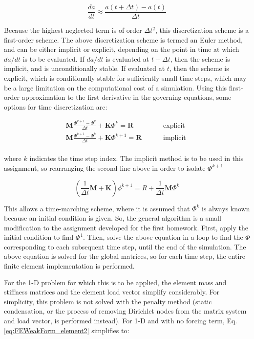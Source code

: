 \documentclass[10pt]{article}
\begin{document}
\begin{equation}
\frac{da}{dt}\approx\frac{a(t+\Delta t)-a(t)}{\Delta t}
\end{equation}

Because the highest neglected term is of order \(\Delta t^2\), this discretization scheme is a first-order scheme. The above discretization scheme is termed an Euler method, and can be either implicit or explicit, depending on the point in time at which \(da/dt\) is to be evaluated. If \(da/dt\) is evaluated at \(t+\Delta t\), then the scheme is implicit, and is unconditionally stable. If evaluated at \(t\), then the scheme is explicit, which is conditionally stable for sufficiently small time steps, which may be a large limitation on the computational cost of a simulation. Using this first-order approximation to the first derivative in the governing equations, some options for time discretization are:

\begin{equation}
\begin{aligned}
\textbf{M}\frac{\Phi^{k+1}-\Phi^k}{\Delta t}+\textbf{K}\Phi^{k}=\textbf{R} & \quad\quad\text{ explicit }\\
\textbf{M}\frac{\Phi^{k+1}-\Phi^k}{\Delta t}+\textbf{K}\Phi^{k+1}=\textbf{R} & \quad\quad\text{ implicit }\\
\end{aligned}
\end{equation}

where \(k\) indicates the time step index. The implicit method is to be used in this assignment, so rearranging the second line above in order to isolate \(\Phi^{k+1}\)

\begin{equation}
\left(\frac{1}{\Delta t}\textbf{M}+\textbf{K}\right)\phi^{k+1}=R+\frac{1}{\Delta t}\textbf{M}\Phi^k
\end{equation}

This allows a time-marching scheme, where it is assumed that \(\Phi^k\) is always known because an initial condition is given. So, the general algorithm is a small modification to the assignment developed for the first homework. First, apply the initial condition to find \(\Phi^1\). Then, solve the above equation in a loop to find the \(\Phi\) corresponding to each subsequent time step, until the end of the simulation. The above equation is solved for the global matrices, so for each time step, the entire finite element implementation is performed. 

For the 1-D problem for which this is to be applied, the element mass and stiffness matrices and the element load vector simplify considerably. For simplicity, this problem is not solved with the penalty method (static condensation, or the process of removing Dirichlet nodes from the matrix system and load vector, is performed instead). For 1-D and with no forcing term, Eq. \eqref{eq:FEWeakForm_element2} simplifies to:
\end{document}
